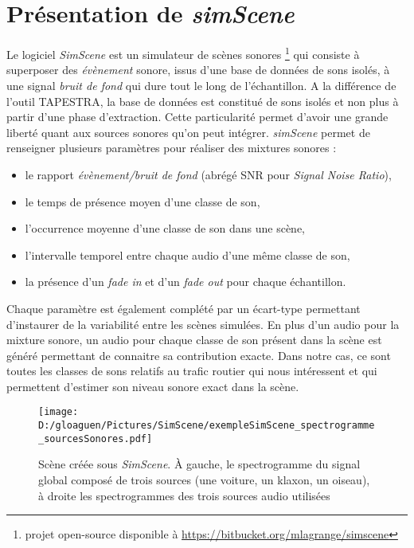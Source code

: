 \section{Présentation de \textit{simScene}}
Le logiciel \textit{SimScene} \cite{rossignol_simscene:_2015} est un simulateur de scènes sonores \footnote{projet open-source disponible à \url{https://bitbucket.org/mlagrange/simscene}} qui consiste à superposer des \textit{évènement} sonore, issus d'une base de données de sons isolés, à une signal \textit{bruit de fond} qui dure tout le long de l'échantillon. A la différence de l'outil TAPESTRA, la base de données est constitué de sons isolés et non plus à partir d'une phase d'extraction. Cette particularité permet d'avoir une grande liberté quant aux sources sonores qu'on peut intégrer. \textit{simScene} permet de renseigner plusieurs paramètres pour réaliser des mixtures sonores : 

\begin{itemize}
\item le rapport \textit{évènement/bruit de fond} (abrégé SNR pour \textit{Signal Noise Ratio}),
\item le temps de présence moyen d'une classe de son,
\item l'occurrence moyenne d'une classe de son dans une scène, 
\item l'intervalle temporel entre chaque audio d'une même classe de son,
\item la présence d'un \textit{fade in} et d'un \textit{fade out} pour chaque échantillon.\\
\end{itemize}

Chaque paramètre est également complété par un écart-type permettant d'instaurer de la variabilité entre les scènes simulées. En plus d'un audio pour la mixture sonore, un audio pour chaque classe de son présent dans la scène est généré permettant de connaitre sa contribution exacte. Dans notre cas, ce sont toutes les classes de sons relatifs au trafic routier qui nous intéressent et qui permettent d'estimer son niveau sonore exact dans la scène.\\

\begin{figure}[hbtp]
\centering
\texttt{[image: D:/gloaguen/Pictures/SimScene/exempleSimScene\_spectrogramme\_sourcesSonores.pdf]}
\caption{Scène créée sous \textit{SimScene}. \`A gauche, le spectrogramme du signal global composé de trois sources (une voiture, un klaxon, un oiseau), à droite les spectrogrammes des trois sources audio utilisées}
\end{figure}



